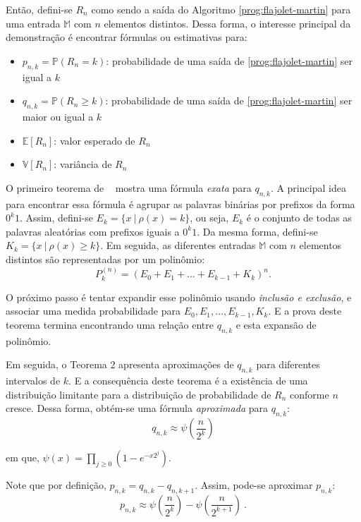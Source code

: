 Então, defini-se $R_n$ como sendo a saída do Algoritmo \ref{prog:flajolet-martin} para uma entrada $\mathbb{M}$
com $n$ elementos distintos. Dessa forma, o interesse principal da demonstração é encontrar fórmulas ou estimativas
para:
\begin{itemize}
  \item $p_{n,k} = \mathbb{P}(R_n = k)$: probabilidade de uma saída de \ref{prog:flajolet-martin} ser igual a $k$
  \item $q_{n,k} = \mathbb{P}(R_n \geq k)$: probabilidade de uma saída de \ref{prog:flajolet-martin} 
  ser maior ou igual a $k$
  \item $\mathbb{E}[R_n]$: valor esperado de $R_n$
  \item $\mathbb{V}[R_n]$: variância de $R_n$
\end{itemize}

O primeiro teorema de ~\citep{flajolet:martin:85} mostra uma fórmula \textit{exata} para $q_{n,k}$. 
A principal idea para encontrar essa fórmula é agrupar as palavras binárias por prefixos da forma $0^k1$.
Assim, defini-se $E_k = \{ x  \ | \ \rho(x) = k \}$, ou seja, $E_k$ é o conjunto de todas as palavras aleatórias com prefixos
iguais a $0^k1$. Da mesma forma, defini-se $K_k = \{ x \ | \ \rho(x) \geq k \}$. Em seguida, as diferentes entradas $\mathbb{M}$
com $n$ elementos distintos são representadas por um polinômio:
\[ P_k^{(n)} = (E_0 + E_1 + \dots + E_{k-1} + K_k)^n .\]

O próximo passo é tentar expandir esse polinômio usando \textit{inclusão e exclusão}, 
e associar uma medida probabilidade para $E_0, E_1, \dots, E_{k-1}, K_k$. E a prova deste teorema termina encontrando uma relação entre $q_{n,k}$
e esta expansão de polinômio.

Em seguida, o Teorema 2 apresenta aproximações de $q_{n,k}$ para diferentes intervalos de $k$.
E a consequência deste teorema é a existência de uma distribuição limitante para a distribuição
de probabilidade de $R_n$ conforme $n$ cresce. Dessa forma, obtém-se uma fórmula \textit{aproximada}
para $q_{n,k}$:
\[ q_{n,k} \approx \psi(\frac{n}{2^k}) \]

em que, $\psi(x) = \prod_{j \geq 0} (1 - e^{-x2^j})$.

Note que por definição, $p_{n,k} = q_{n,k} - q_{n,k+1}$. Assim, pode-se aproximar $p_{n,k}$:
\[ p_{n,k} \approx \psi(\frac{n}{2^k}) - \psi(\frac{n}{2^{k+1}}) \ . \]